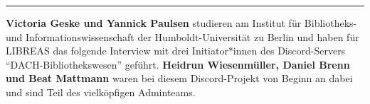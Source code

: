 \begin{center}\rule{0.5\linewidth}{0.5pt}\end{center}

\textbf{Victoria Geske und Yannick Paulsen}  studieren am
Institut für Bibliotheks- und Informationswissenschaft der
Humboldt-Universität zu Berlin und haben für LIBREAS das folgende
Interview mit drei Initiator*innen des Discord-Servers
``DACH-Bibliothekswesen'' geführt. \textbf{Heidrun Wiesenmüller, Daniel Brenn
und Beat Mattmann} waren bei diesem Discord-Projekt von Beginn an dabei
und sind Teil des vielköpfigen Adminteams.
